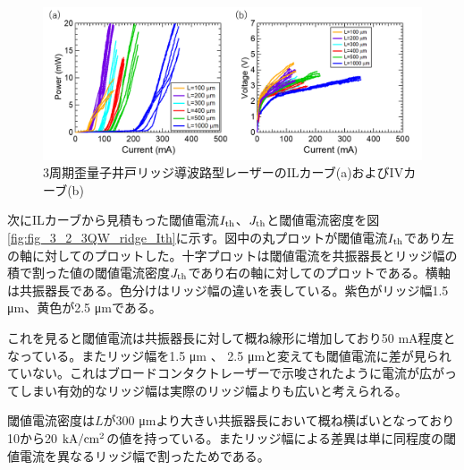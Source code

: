 {\begin{figure}[h]
	\centering
	\includegraphics[width=15cm]{figure/fig_3_2_3QW_ridge_IL.png}
		\caption{3周期歪量子井戸リッジ導波路型レーザーのILカーブ(a)およびIVカーブ(b)}
		\label{fig:fig_3_2_3QW_ridge_IL}
\end{figure}


次にILカーブから見積もった閾値電流$I_{\rm{th}}$、$J_{\rm{th}}$と閾値電流密度を図\ref{fig:fig_3_2_3QW_ridge_Ith}に示す。図中の丸プロットが閾値電流$I_{\rm{th}}$であり左の軸に対してのプロットした。十字プロットは閾値電流を共振器長とリッジ幅の積で割った値の閾値電流密度$J_{\rm{th}}$であり右の軸に対してのプロットである。横軸は共振器長である。色分けはリッジ幅の違いを表している。紫色がリッジ幅1.5 \si{\micro\metre}、黄色が2.5 \si{\micro\metre}である。

これを見ると閾値電流は共振器長に対して概ね線形に増加しており50 mA程度となっている。またリッジ幅を1.5 \si{\micro\metre} 、 2.5 \si{\micro\metre}と変えても閾値電流に差が見られていない。これはブロードコンタクトレーザーで示唆されたように電流が広がってしまい有効的なリッジ幅は実際のリッジ幅よりも広いと考えられる。%

閾値電流密度は$L$が300 \si{\micro\metre}より大きい共振器長において概ね横ばいとなっており10から20 $\rm{kA/cm^2}$の値を持っている。またリッジ幅による差異は単に同程度の閾値電流を異なるリッジ幅で割ったためである。


}
